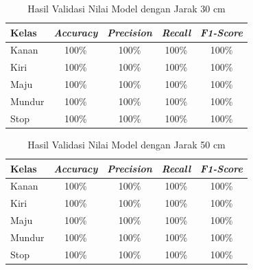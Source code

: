 \begin{table}[ht]
  \caption{Hasil Validasi Nilai Model dengan Jarak 30 cm}
  \label{tb:30cm}
  \centering
  \begin{tabular}{|l|c|c|c|c|}
  \hline
  \rowcolor[HTML]{C0C0C0} 
  \textbf{Kelas} & \textbf{\emph{Accuracy}} & \textbf{\emph{Precision}} & \textbf{\emph{Recall}} & \textbf{\emph{F1-Score}} \\ \hline
  Kanan    & 100\%            & 100\%             & 100\%           & 100\%            \\ \hline
  Kiri     & 100\%          & 100\%           & 100\%           & 100\%           \\ \hline
  Maju      & 100\%          & 100\%           & 100\%          & 100\%          \\ \hline
  Mundur     & 100\%            & 100\%             & 100\%           & 100\%            \\ \hline
  Stop  & 100\%            & 100\%             & 100\%           & 100\%            \\ \hline
  \end{tabular}
\end{table}

\begin{table}[ht]
  \caption{Hasil Validasi Nilai Model dengan Jarak 50 cm}
  \label{tb:50cm}
  \centering
  \begin{tabular}{|l|c|c|c|c|}
  \hline
  \rowcolor[HTML]{C0C0C0} 
  \textbf{Kelas} & \textbf{\emph{Accuracy}} & \textbf{\emph{Precision}} & \textbf{\emph{Recall}} & \textbf{\emph{F1-Score}} \\ \hline
  Kanan    & 100\%            & 100\%             & 100\%           & 100\%            \\ \hline
  Kiri     & 100\%          & 100\%           & 100\%           & 100\%           \\ \hline
  Maju      & 100\%          & 100\%           & 100\%          & 100\%          \\ \hline
  Mundur     & 100\%            & 100\%             & 100\%           & 100\%            \\ \hline
  Stop  & 100\%            & 100\%             & 100\%           & 100\%            \\ \hline
  \end{tabular}
\end{table}

